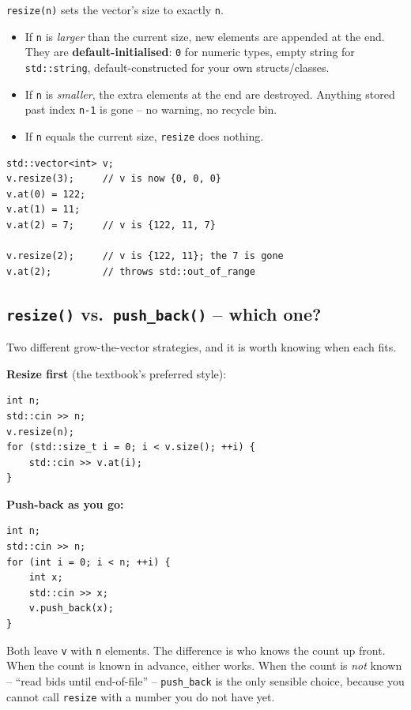 \documentclass[11pt]{article}
\begin{document}
\texttt{resize(n)} sets the vector's size to exactly \texttt{n}.

\begin{itemize}
    \item If \texttt{n} is \emph{larger} than the current size, new
          elements are appended at the end. They are
          \textbf{default-initialised}: \texttt{0} for numeric types,
          empty string for \texttt{std::string}, default-constructed
          for your own structs/classes.
    \item If \texttt{n} is \emph{smaller}, the extra elements at the
          end are destroyed. Anything stored past index \texttt{n-1}
          is gone -- no warning, no recycle bin.
    \item If \texttt{n} equals the current size, \texttt{resize} does
          nothing.
\end{itemize}

\begin{lstlisting}
std::vector<int> v;
v.resize(3);     // v is now {0, 0, 0}
v.at(0) = 122;
v.at(1) = 11;
v.at(2) = 7;     // v is {122, 11, 7}

v.resize(2);     // v is {122, 11}; the 7 is gone
v.at(2);         // throws std::out_of_range
\end{lstlisting}

\subsection{\texttt{resize()} vs.\ \texttt{push\_back()} -- which one?}

Two different grow-the-vector strategies, and it is worth knowing when
each fits.

\begin{examplebox}
\textbf{Resize first} (the textbook's preferred style):
\begin{lstlisting}
int n;
std::cin >> n;
v.resize(n);
for (std::size_t i = 0; i < v.size(); ++i) {
    std::cin >> v.at(i);
}
\end{lstlisting}

\textbf{Push-back as you go:}
\begin{lstlisting}
int n;
std::cin >> n;
for (int i = 0; i < n; ++i) {
    int x;
    std::cin >> x;
    v.push_back(x);
}
\end{lstlisting}

Both leave \texttt{v} with \texttt{n} elements. The difference is who
knows the count up front. When the count is known in advance, either
works. When the count is \emph{not} known -- ``read bids until
end-of-file'' -- \texttt{push\_back} is the only sensible choice,
because you cannot call \texttt{resize} with a number you do not
have yet.
\end{examplebox}
\end{document}
